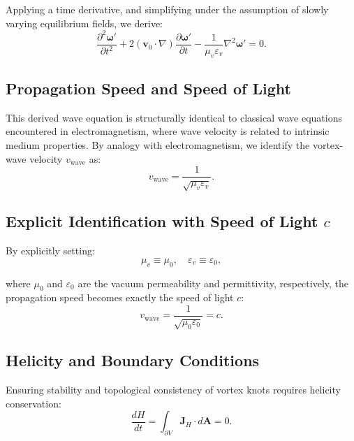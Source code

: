 \documentclass[a4paper,12pt]{article}
\begin{document}
Applying a time derivative, and simplifying under the assumption of slowly varying equilibrium fields, we derive:
\begin{equation}
    \frac{\partial^2 \boldsymbol{\omega}'}{\partial t^2}+2(\mathbf{v}_0\cdot\nabla)\frac{\partial\boldsymbol{\omega}'}{\partial t} - \frac{1}{\mu_v \varepsilon_v}\nabla^2 \boldsymbol{\omega}' = 0.
\end{equation}


\subsection{Propagation Speed and Speed of Light}


This derived wave equation is structurally identical to classical wave equations encountered in electromagnetism, where wave velocity is related to intrinsic medium properties. By analogy with electromagnetism, we identify the vortex-wave velocity $v_\text{wave}$ as:
\begin{equation}
    v_\text{wave} = \frac{1}{\sqrt{\mu_v \varepsilon_v}}.
\end{equation}


\subsection{Explicit Identification with Speed of Light $c$}


By explicitly setting:
\begin{equation}
    \mu_v \equiv \mu_0, \quad \varepsilon_v \equiv \varepsilon_0,
\end{equation}


where $\mu_0$ and $\varepsilon_0$ are the vacuum permeability and permittivity, respectively, the propagation speed becomes exactly the speed of light $c$:
\begin{equation}
    v_\text{wave} = \frac{1}{\sqrt{\mu_0 \varepsilon_0}} = c.
\end{equation}


\subsection{Helicity and Boundary Conditions}


Ensuring stability and topological consistency of vortex knots requires helicity conservation:
\begin{equation}
    \frac{dH}{dt} = \int_{\partial V} \mathbf{J}_H \cdot d\mathbf{A} = 0.
\end{equation}
\end{document}
